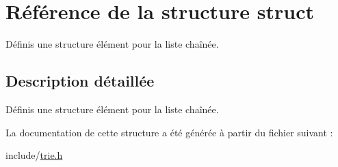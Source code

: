 \hypertarget{structstruct}{\section{Référence de la structure struct}
\label{structstruct}
}


Définis une structure élément pour la liste chaînée.  




\subsection{Description détaillée}
Définis une structure élément pour la liste chaînée. 

La documentation de cette structure a été générée à partir du fichier suivant \+:\begin{DoxyCompactItemize}
\item 
include/\hyperlink{trie_8h}{trie.\+h}\end{DoxyCompactItemize}
